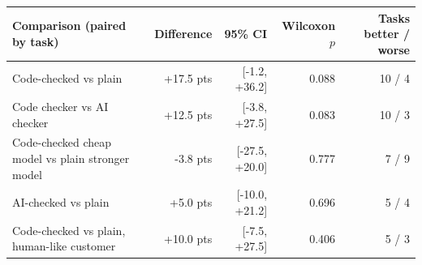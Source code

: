 \begin{tabular}{lrrrr}
\toprule
Comparison (paired by task) & Difference & 95\% CI & Wilcoxon $p$ & Tasks better / worse \\
\midrule
Code-checked vs plain & +17.5 pts & [-1.2, +36.2] & 0.088 & 10 / 4 \\
Code checker vs AI checker & +12.5 pts & [-3.8, +27.5] & 0.083 & 10 / 3 \\
Code-checked cheap model vs plain stronger model & -3.8 pts & [-27.5, +20.0] & 0.777 & 7 / 9 \\
AI-checked vs plain & +5.0 pts & [-10.0, +21.2] & 0.696 & 5 / 4 \\
Code-checked vs plain, human-like customer & +10.0 pts & [-7.5, +27.5] & 0.406 & 5 / 3 \\
\bottomrule
\end{tabular}
